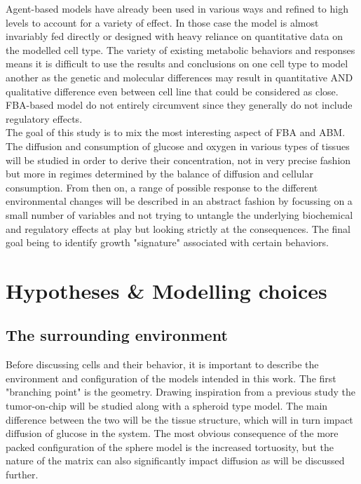 \documentclass[11pt,a4paper]{article}
\begin{document}
Agent-based models have already been used in various ways and refined to high levels to account for a variety of effect. In those case the model is almost invariably fed directly or designed with heavy reliance on quantitative data on the modelled cell type. The variety of existing metabolic  behaviors and responses means it is difficult to use the results and conclusions on one cell type to model another as the genetic and molecular differences may result in quantitative AND qualitative difference even between cell line that could be considered as close\cite{Waker2018}\cite{Griguer2005}. FBA-based model do not entirely circumvent since they generally do not include regulatory effects.\\

The goal of this study is to mix the most interesting aspect of FBA and ABM. The diffusion and consumption of glucose and oxygen in various types of tissues will be studied in order to derive their concentration, not in very precise fashion but more in regimes determined by the balance of diffusion and cellular consumption. From then on, a range of possible response to the different environmental changes will be described in an abstract fashion by focussing on a small number of variables and not trying to untangle the underlying biochemical and regulatory effects at play but looking strictly at the consequences. The final goal being to identify growth "signature" associated with certain behaviors.

\section{Hypotheses \& Modelling choices}
\subsection{The surrounding environment}
Before discussing cells and their behavior, it is important to describe the environment and configuration of the models intended in this work. The first "branching point" is the geometry. Drawing inspiration from a previous study the tumor-on-chip will be studied along with a spheroid type model. The main difference between the two will be the tissue structure, which will in turn impact diffusion of glucose in the system. The most obvious consequence of the more packed configuration of the sphere model is the increased tortuosity, but the nature of the matrix can also significantly impact diffusion as will be discussed further.
\end{document}
